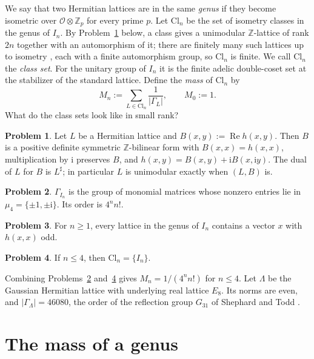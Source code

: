 \documentclass[reqno]{amsart}
\theoremstyle{definition}
\newtheorem{problem}{Problem}[section]
\theoremstyle{plain}
\newcommand{\Z}{\mathbb{Z}}
\newcommand{\ii}{\mathrm{i}}
\newcommand{\Oc}{\mathcal{O}}
\newcommand{\Cl}{\mathrm{Cl}}
\begin{document}
We say that two Hermitian lattices are in the same \emph{genus} if they become isometric over \(\Oc \otimes \Z_p\) for every prime \(p\).  Let \(\Cl_n\) be the set of isometry classes in the genus of \(I_n\).  By Problem~\ref{pr:real} below, a class gives a unimodular \(\Z\)-lattice of rank \(2n\) together with an automorphism of it; there are finitely many such lattices up to isometry \cite[Ch.~9]{Ca}, each with a finite automorphism group, so \(\Cl_n\) is finite.  We call \(\Cl_n\) the \emph{class set}.  For the unitary group of \(I_n\) it is the finite adelic double-coset set at the stabilizer of the standard lattice.  Define the \emph{mass} of \(\Cl_n\) by
\[
  M_n := \sum_{L \in \Cl_n} \frac{1}{\lvert \Gamma_L \rvert}, \qquad M_0 := 1 .
\]
What do the class sets look like in small rank?

\begin{problem}\label{pr:real}
Let \(L\) be a Hermitian lattice and \(B(x,y) := \operatorname{Re} h(x,y)\).  Then \(B\) is a positive definite symmetric \(\Z\)-bilinear form with \(B(x,x) = h(x,x)\), multiplication by \(\ii\) preserves \(B\), and \(h(x,y) = B(x,y) + \ii B(x, \ii y)\).  The dual of \(L\) for \(B\) is \(L^\sharp\); in particular \(L\) is unimodular exactly when \((L, B)\) is.
\end{problem}

\begin{problem}\label{pr:aut}
\(\Gamma_{I_n}\) is the group of monomial matrices whose nonzero entries lie in \(\mu_4 = \{\pm 1, \pm \ii\}\).  Its order is \(4^n n!\).
\end{problem}

\begin{problem}\label{pr:odd}
For \(n \ge 1\), every lattice in the genus of \(I_n\) contains a vector \(x\) with \(h(x,x)\) odd.
\end{problem}

\begin{problem}\label{pr:class-one}
If \(n \le 4\), then \(\Cl_n = \{I_n\}\).
\end{problem}

Combining Problems~\ref{pr:aut} and~\ref{pr:class-one} gives \(M_n = 1/(4^n n!)\) for \(n \le 4\).  Let \(\Lambda\) be the Gaussian Hermitian lattice with underlying real lattice \(E_8\).  Its norms are even, and \(\lvert\Gamma_\Lambda\rvert=46080\), the order of the reflection group \(G_{31}\) of Shephard and Todd \cite{ShT}.


\section{The mass of a genus}\label{sec:mass}
\end{document}
